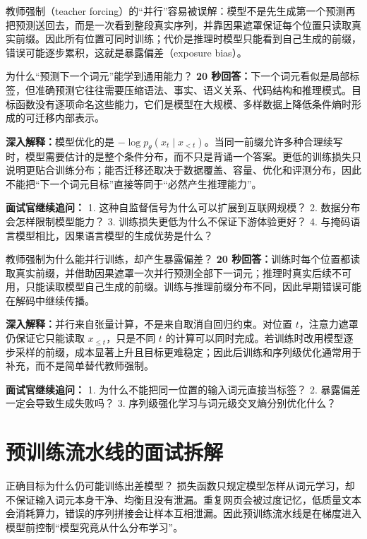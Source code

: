 教师强制（teacher forcing）的“并行”容易被误解：模型不是先生成第一个预测再把预测送回去，而是一次看到整段真实序列，并靠因果遮罩保证每个位置只读取真实前缀。因此所有位置可同时训练；代价是推理时模型只能看到自己生成的前缀，错误可能逐步累积，这就是暴露偏差（exposure bias）。

\figPretrainingPipeline

\begin{interviewbox}{为什么“预测下一个词元”能学到通用能力？}
\textbf{20 秒回答：}下一个词元看似是局部标签，但准确预测它往往需要压缩语法、事实、语义关系、代码结构和推理模式。目标函数没有逐项命名这些能力，它们是模型在大规模、多样数据上降低条件熵时形成的可迁移内部表示。

\textbf{深入解释：}模型优化的是 $-\log p_\theta(x_t\mid x_{<t})$。当同一前缀允许多种合理续写时，模型需要估计的是整个条件分布，而不只是背诵一个答案。更低的训练损失只说明更贴合训练分布；能否迁移还取决于数据覆盖、容量、优化和评测分布，因此不能把“下一个词元目标”直接等同于“必然产生推理能力”。

\textbf{面试官继续追问：}
1. 这种自监督信号为什么可以扩展到互联网规模？
2. 数据分布会怎样限制模型能力？
3. 训练损失更低为什么不保证下游体验更好？
4. 与掩码语言模型相比，因果语言模型的生成优势是什么？
\end{interviewbox}

\begin{interviewbox}{教师强制为什么能并行训练，却产生暴露偏差？}
\textbf{20 秒回答：}训练时每个位置都读取真实前缀，并借助因果遮罩一次并行预测全部下一词元；推理时真实后续不可用，只能读取模型自己生成的前缀。训练与推理前缀分布不同，因此早期错误可能在解码中继续传播。

\textbf{深入解释：}并行来自张量计算，不是来自取消自回归约束。对位置 $t$，注意力遮罩仍保证它只能读取 $x_{\le t}$，只是不同 $t$ 的计算可以同时完成。若训练时改用模型逐步采样的前缀，成本显著上升且目标更难稳定；因此后训练和序列级优化通常用于补充，而不是简单替代教师强制。

\textbf{面试官继续追问：}
1. 为什么不能把同一位置的输入词元直接当标签？
2. 暴露偏差一定会导致生成失败吗？
3. 序列级强化学习与词元级交叉熵分别优化什么？
\end{interviewbox}

\section{预训练流水线的面试拆解}

\begin{motivationbox}{正确目标为什么仍可能训练出差模型？}
损失函数只规定模型怎样从词元学习，却不保证输入词元本身干净、均衡且没有泄漏。重复网页会被过度记忆，低质量文本会消耗算力，错误的序列拼接会让样本互相泄漏。因此预训练流水线是在梯度进入模型前控制“模型究竟从什么分布学习”。
\end{motivationbox}

